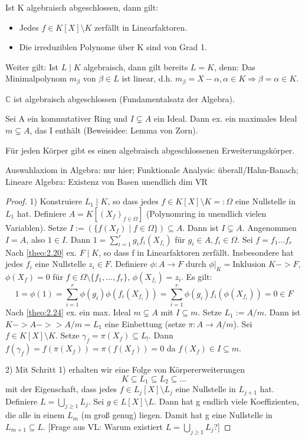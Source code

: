 \documentclass[../main.tex]{subfiles}
\begin{document}
\begin{remark}\label{theo:2.22}
    Ist K algebraisch abgeschlossen, dann gilt:
    \begin{itemize}
        \item Jedes $f \in K[X]\setminus K$ zerfällt in Linearfaktoren.
        \item Die irreduziblen Polynome über K sind von Grad 1.
    \end{itemize}
    Weiter gilt: Ist $L \mid K$ algebraisch, dann gilt bereits $L = K$, denn: Das Minimalpolynom $m_\beta$ von $\beta \in L$ ist linear, d.h. $m_\beta = X - \alpha, \alpha \in K \Rightarrow \beta = \alpha \in K$.
\end{remark}
\begin{example*}
    $\mathbb{C}$ ist algebraisch abgeschlossen (Fundamentalsatz der Algebra).
\end{example*}
\begin{lemma}
    Sei A ein kommutativer Ring und $I \subsetneq A$ ein Ideal. Dann ex. ein maximales Ideal $m \subsetneq A$, das I enthält (Beweisidee: Lemma von Zorn).
\end{lemma}
\begin{theorem}\label{theo:2.24}
    Für jeden Körper gibt es einen algebraisch abgeschlossenen Erweiterungskörper.
\end{theorem}
Auswahlaxiom in Algebra: nur hier;
Funktionale Analysis: überall/Hahn-Banach;
Lineare Algebra: Existenz von Basen unendlich dim VR
\begin{proof}
1) Konstruiere $L_1 \mid K$, so dass jedes $f \in K[X]\setminus K =: \Omega$ eine Nullstelle in $L_1$ hat. Definiere $A = K[(X_f)_{f \in \Omega}]$ (Polynomring in unendlich vielen Variablen). Setze $I := (\{f(X_f) \mid f \in \Omega\}) \subseteq A$. Dann ist $I \subsetneq A$. Angenommen $I = A$, also $1 \in I$. Dann $1 = \sum_{i = 1}^r g_if_i(X_{f_i})$ für $g_i \in A, f_i \in \Omega$. Sei $f = f_1...f_r$ Nach \ref{theo:2.20} ex. $F \mid K$, so dass f in Linearfaktoren zerfällt. Insbesondere hat jedes $f_i$ eine Nullstelle $z_i \in F$. Definiere $\phi: A \rightarrow F$ durch $\phi|_K = \text{Inklusion } K -> F$, $\phi(X_f) = 0$ für $f \in \Omega\setminus\{f_1,...,f_r\}$, $\phi(X_{f_i}) = z_i$. Es gilt: $$1 = \phi(1) = \sum_{i = 1}^r \phi(g_i)\phi(f_i(X_{f_i})) = \sum_{i = 1}^r \phi(g_i)f_i(\phi(X_{f_i})) = 0 \in F$$
Nach \ref{theo:2.24} ex. ein max. Ideal $m \subsetneq A$ mit $I \subseteq m$. Setze $L_1 := A/m$.
Dann ist $K -> A ->> A/m = L_1$ eine Einbettung (setze $\pi: A \rightarrow A/m$). Sei $f \in K[X]\setminus K$. Setze $\gamma_f = \pi(X_f) \subseteq L_!$. Dann $f(\gamma_f) = f(\pi(X_f)) = \pi(f(X_f)) = 0$ da $f(X_f) \in I \subseteq m$.

2) Mit Schritt 1) erhalten wir eine Folge von Körpererweiterungen $$K \subseteq L_1 \subseteq L_2 \subseteq ...$$ mit der Eigenschaft, dass jedes $f \in L_j[X]\setminus L_j$ eine Nullstelle in $L_{j+1}$ hat. Definiere $L = \bigcup_{j \geq 1} L_j$. Sei $g \in L[X]\setminus L$. Dann hat g endlich viele Koeffizienten, die alle in einem $L_m$ (m groß genug) liegen. Damit hat g eine Nullstelle in $L_{m+1} \subseteq L$. [Frage aus VL: Warum existiert $L = \bigcup_{j \geq 1} L_j$?]
\end{proof}
\end{document}
